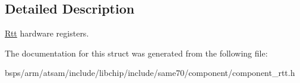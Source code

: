 \subsection{Detailed Description}
\mbox{\hyperlink{structRtt}{Rtt}} hardware registers. 

The documentation for this struct was generated from the following file\+:\begin{DoxyCompactItemize}
\item 
bsps/arm/atsam/include/libchip/include/same70/component/component\+\_\+rtt.\+h\end{DoxyCompactItemize}
